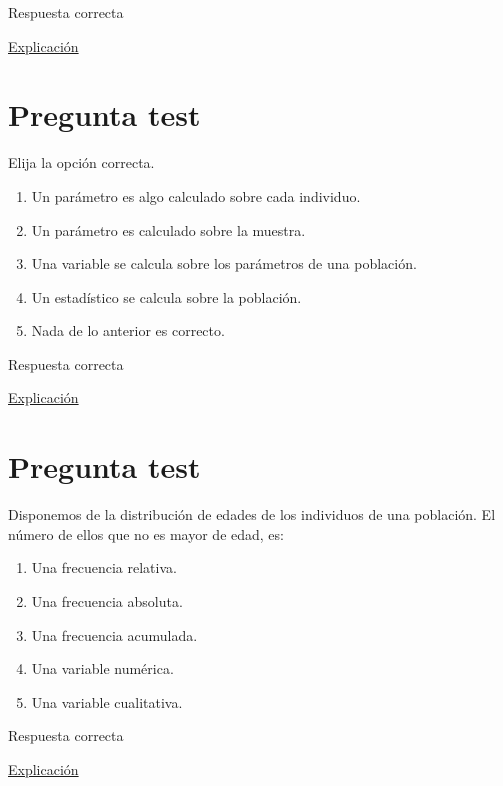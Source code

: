 \documentclass[
]{book}
\providecommand{\tightlist}{%
  \setlength{\itemsep}{0pt}\setlength{\parskip}{0pt}}
\begin{document}
Respuesta correcta

\href{https://1fjmanzano.github.io/bioestadistica/tipos-de-variables.html}{Explicación}

\hypertarget{pregunta-test-12}{%
\section{Pregunta test}\label{pregunta-test-12}}

Elija la opción correcta.

\begin{enumerate}
\def\labelenumi{\alph{enumi})}
\tightlist
\item
  Un parámetro es algo calculado sobre cada individuo.
\item
  Un parámetro es calculado sobre la muestra.
\item
  Una variable se calcula sobre los parámetros de una población.
\item
  Un estadístico se calcula sobre la población.
\item
  Nada de lo anterior es correcto.
\end{enumerate}

Respuesta correcta

\href{https://1fjmanzano.github.io/bioestadistica/conceptos-previos.html}{Explicación}

\hypertarget{pregunta-test-13}{%
\section{Pregunta test}\label{pregunta-test-13}}

Disponemos de la distribución de edades de los individuos de una población. El número de ellos que no es mayor de edad, es:

\begin{enumerate}
\def\labelenumi{\alph{enumi})}
\tightlist
\item
  Una frecuencia relativa.
\item
  Una frecuencia absoluta.
\item
  Una frecuencia acumulada.
\item
  Una variable numérica.
\item
  Una variable cualitativa.
\end{enumerate}

Respuesta correcta

\href{https://1fjmanzano.github.io/bioestadistica/tablas-de-frecuencias.html}{Explicación}
\end{document}
